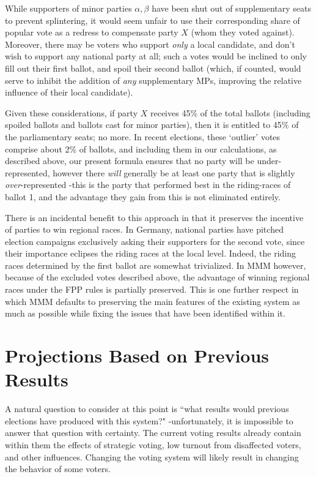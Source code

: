 \documentclass[DIV=calc, paper=a4, fontsize=11pt, twocolumn]{scrartcl}	 %
\begin{document}
While supporters of minor parties $\alpha,\beta$ have been shut out of supplementary seats to prevent splintering, it would seem unfair to use their corresponding share of popular vote as a redress to compensate party $X$ (whom they voted against). Moreover, there may be voters who support \emph{only} a local candidate, and don't wish to support any national party at all; such a votes would be inclined to only fill out their first ballot, and spoil their second ballot (which, if counted, would serve to inhibit the addition of \emph{any} supplementary MPs, improving the relative influence of their local candidate).

Given these considerations, if party $X$ receives 45\% of the total ballots (including spoiled ballots and ballots cast for minor parties), then it is entitled to 45\% of the parliamentary seats; no more. In recent elections, these `outlier' votes comprise about 2\% of ballots, and including them in our calculations, as described above, our present formula ensures that no party will be under-represented, however there \emph{will} generally be at least one party that is slightly \emph{over}-represented \--this is the party that performed best in the riding-races of ballot 1, and the advantage they gain from this is not eliminated entirely.

There is an incidental benefit to this approach in that it preserves the incentive of parties to win regional races. In Germany, national parties have pitched election campaigns exclusively asking their supporters for the second vote, since their importance eclipses the riding races at the local level. Indeed, the riding races determined by the first ballot are somewhat trivialized.
In MMM however, because of the excluded votes described above, the advantage of winning regional races under the FPP rules is partially preserved. This is one further respect in which MMM defaults to preserving the main features of the existing system as much as possible while fixing the issues that have been identified within it.

\section{Projections Based on Previous Results}

A natural question to consider at this point is ``what results would previous elections have produced with this system?" \--unfortunately, it is impossible to answer that question with certainty. 
The current voting results already contain within them the effects of strategic voting, low turnout from disaffected voters, and other influences. Changing the voting system will likely result in changing the behavior of some voters.
\end{document}
